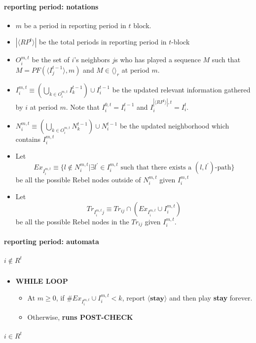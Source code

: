 \documentclass[12pt,letter]{article}
\theoremstyle{definition}
\theoremstyle{remark}
\theoremstyle{claim}
\begin{document}
\paragraph{reporting period: notations}
\begin{itemize}
\item $m$ be a period in reporting period in $t$ block.
\item $|\langle RP^t \rangle|$ be the total periods in reporting period in $t$-block
\item $O^{m,t}_i$ be the set of $i$'s neighbors $j$s who has played a sequence $M$ such that $M=PF(\langle I^{t-1}_j \rangle,m)$ and $M \in \langle \rangle_r$ at period $m$. 
\item $I^{m,t}_i\equiv (\bigcup_{k\in O^{m,t}_i} I^{t-1}_k)\cup I^{t-1}_i$ be the updated relevant information gathered by $i$ at period $m$. Note that $I^{0,t}_i=I^{t-1}_i$ and $I^{|\langle RP^t \rangle|,t }_i=I^{t}_i$.
\item $N^{m,t}_i\equiv (\bigcup_{k\in O^{m,t}_i} N^{t-1}_k)\cup N^{t-1}_i$
be the updated neighborhood which contains $I^{m,t}_i$

\item Let 
\[Ex_{I^{m,t}_i}\equiv \{l\notin N^{m,t}_i|\exists l^{'}\in I^{m,t}_i\text{ such that there exists a $(l,l^{'})$-path}\}\]
be all the possible Rebel nodes outside of $N^{m,t}_i$ given $I^{m,t}_i$
\item Let
\[Tr_{I^{m,t}_ij}\equiv Tr_{ij}\cap (Ex_{I^{m,t}_i}\cup I^{m,t}_i)\]
be all the possible Rebel nodes in the $Tr_{ij}$ given $I^{m,t}_i$. 
\end{itemize}
\paragraph{reporting period: automata}
\subparagraph{$i\notin R^{t}$}




\begin{itemize}
\item \textbf{WHILE LOOP}
\begin{itemize}
\item At $m\geq 0$, if $\#Ex_{I^{m,t}_i}\cup I^{m,t}_i< k$, report $\langle \textbf{stay} \rangle$ and then play \textbf{stay} forever.
\item Otherwise, \textbf{runs POST-CHECK }
\end{itemize}
\end{itemize}

\subparagraph{$i\in R^{t}$}
\end{document}
